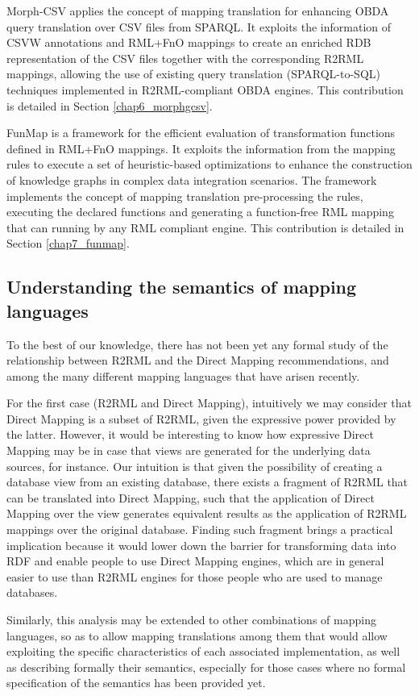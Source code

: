 Morph-CSV applies the concept of mapping translation for enhancing OBDA query translation over CSV files from SPARQL. It exploits the information of CSVW annotations and RML+FnO mappings to create an enriched RDB representation of the CSV files together with the corresponding R2RML mappings, allowing the use of existing query translation (SPARQL-to-SQL) techniques implemented in R2RML-compliant OBDA engines. This contribution is detailed in Section \ref{chap6_morphgcsv}.

FunMap is a framework for the efficient evaluation of transformation functions defined in RML+FnO mappings. It exploits the information from the mapping rules to execute a set of heuristic-based optimizations to enhance the construction of knowledge graphs in complex data integration scenarios. The framework implements the concept of mapping translation pre-processing the rules, executing the declared functions and generating a function-free RML mapping that can running by any RML compliant engine. This contribution is detailed in Section \ref{chap7_funmap}.


\subsection{Understanding the semantics of mapping languages}
To the best of our knowledge, there has not been yet any formal study of the relationship between R2RML and the Direct Mapping recommendations, and among the many different mapping languages that have arisen recently.

For the first case (R2RML and Direct Mapping), intuitively we may consider that Direct Mapping is a subset of R2RML, given the expressive power provided by the latter. However, it would be interesting to know how expressive Direct Mapping may be in case that views are generated for the underlying data sources, for instance. Our intuition is that given the possibility of creating a database view from an existing database, there exists a fragment of R2RML that can be translated into Direct Mapping, such that the application of Direct Mapping over the view generates equivalent results as the application of R2RML mappings over the original database. Finding such fragment brings a practical implication because it would lower down the barrier for transforming data into RDF and enable people to use Direct Mapping engines, which are in general easier to use than R2RML engines for those people who are used to manage databases.

Similarly, this analysis may be extended to other combinations of mapping languages, so as to allow mapping translations among them that would allow exploiting the specific characteristics of each associated implementation, as well as describing formally their semantics, especially for those cases where no formal specification of the semantics has been provided yet.

